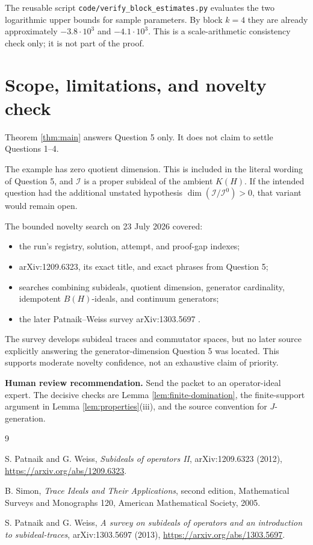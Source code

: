\documentclass[11pt]{article}
\newcommand{\BH}{B(H)}
\begin{document}
The reusable script \texttt{code/verify\_block\_estimates.py} evaluates the
two logarithmic upper bounds for sample parameters.  By block \(k=4\) they
are already approximately \(-3.8\cdot10^3\) and
\(-4.1\cdot10^3\).  This is a scale-arithmetic consistency check only; it is
not part of the proof.

\section{Scope, limitations, and novelty check}

Theorem \ref{thm:main} answers Question 5 only.  It does not claim to settle
Questions 1--4.

The example has zero quotient dimension.  This is included in the literal
wording of Question 5, and \(\mathcal I\) is a proper subideal of the ambient
\(K(H)\).  If the intended question had the additional unstated hypothesis
\(\dim(\mathcal I/\mathcal I^0)>0\), that variant would remain open.

The bounded novelty search on 23 July 2026 covered:
\begin{itemize}
 \item the run's registry, solution, attempt, and proof-gap indexes;
 \item arXiv:1209.6323, its exact title, and exact phrases from Question 5;
 \item searches combining subideals, quotient dimension, generator
       cardinality, idempotent \(\BH\)-ideals, and continuum generators;
 \item the later Patnaik--Weiss survey arXiv:1303.5697 \cite{PWsurvey}.
\end{itemize}
The survey develops subideal traces and commutator spaces, but no later source
explicitly answering the generator-dimension Question 5 was located.  This
supports moderate novelty confidence, not an exhaustive claim of priority.

\textbf{Human review recommendation.}
Send the packet to an operator-ideal expert.  The decisive checks are Lemma
\ref{lem:finite-domination}, the finite-support argument in Lemma
\ref{lem:properties}(iii), and the source convention for \(J\)-generation.

\begin{thebibliography}{9}

S. Patnaik and G. Weiss,
\emph{Subideals of operators II},
arXiv:1209.6323 (2012),
\url{https://arxiv.org/abs/1209.6323}.

B. Simon,
\emph{Trace Ideals and Their Applications},
second edition, Mathematical Surveys and Monographs 120,
American Mathematical Society, 2005.

S. Patnaik and G. Weiss,
\emph{A survey on subideals of operators and an introduction to
subideal-traces},
arXiv:1303.5697 (2013),
\url{https://arxiv.org/abs/1303.5697}.

\end{thebibliography}
\end{document}
